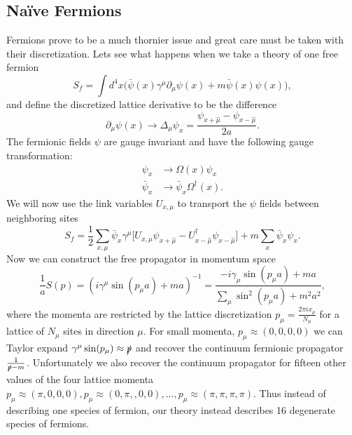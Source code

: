 \subsection{Naïve Fermions}
Fermions prove to be a much thornier issue and great care must be taken with their discretization.
Lets see what happens when we take a theory of one free fermion
\begin{equation}
  S_f=\int d^4x\Big(\bar{\psi}(x)\gamma^\mu\partial_\mu\psi(x)+m\bar{\psi}(x)\psi(x)\Big),
\end{equation}
and define the discretized lattice derivative to be the difference 
\begin{equation}
  \partial_\mu\psi(x)\rightarrow\Delta_\mu\psi_x=\frac{\psi_{x+\hat{\mu}}-\psi_{x-\hat{\mu}}}{2a}.
\end{equation}
The fermionic fields $\psi$ are gauge invariant and have the following gauge transformation:
\begin{equation}
  \begin{aligned}
    \psi_x&\rightarrow\Omega(x)\psi_x \\
    \bar{\psi}_x&\rightarrow\bar{\psi}_x\Omega^\dagger(x).
  \end{aligned}
\end{equation}
We will now use the link variables $U_{x,\mu}$ to transport the $\psi$ fields between neighboring sites
\begin{equation}
  S_f=\frac{1}{2}\sum_{x,\mu} \bar{\psi}_x\gamma^\mu\big[U_{x,\mu}\psi_{x+\hat{\mu}}-U^\dagger_{x-\hat{\mu}}\psi_{x-\hat{\mu}}\big]+m\sum_x \bar{\psi}_x\psi_x.
\end{equation}
Now we can construct the free propagator in momentum space
\begin{equation}
  \frac{1}{a}S(p)=(i\gamma^\mu\sin(p_\mu a) + ma)^{-1}=\frac{-i\gamma_\mu\sin(p_\mu a)+ma}{\sum_\mu \sin^2(p_\mu a)+m^2a^2},
\end{equation}
where the momenta are restricted by the lattice discretization $p_\mu=\frac{2\pi ix_\mu}{N_\mu}$ for a lattice of $N_\mu$ sites in direction $\mu$.
For small momenta, $p_\mu \approx (0,0,0,0)$ we can Taylor expand $\gamma^\mu\sin(p_\mu)\approx \slashed{p}$ and recover the continuum fermionic propagator $\frac{1}{\slashed{p}-m}$.
Unfortunately we also recover the continuum propagator for fifteen other values of the four lattice momenta $p_\mu\approx(\pi,0,0,0),p_\mu\approx(0,\pi,,0,0),...,p_\mu\approx(\pi,\pi,\pi,\pi)$.
Thus instead of describing one species of fermion, our theory instead describes 16 degenerate species of fermions.

